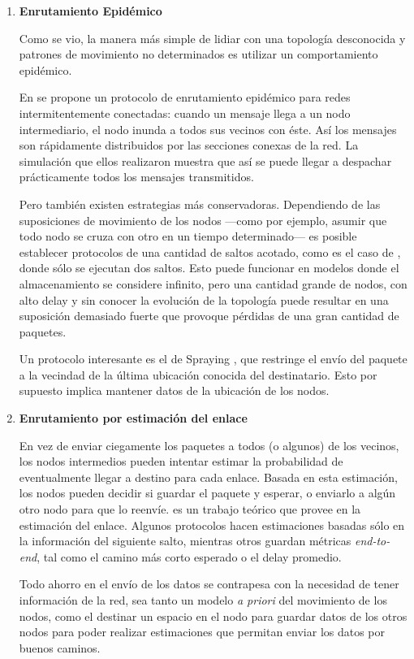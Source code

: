 \documentclass[10pt,preprint,onecolumn]{paper}
\begin{document}
\begin{enumerate}
\item \textbf{Enrutamiento Epidémico}

Como se vio, la manera más simple de lidiar con una topología desconocida y patrones de movimiento no determinados es utilizar un comportamiento epidémico.

En \cite{epidemic} se propone un protocolo de enrutamiento epidémico para redes intermitentemente conectadas: cuando un mensaje llega a un nodo intermediario, el nodo inunda a todos sus vecinos con éste. Así los mensajes son rápidamente distribuidos por las secciones conexas de la red. La simulación que ellos realizaron muestra que así se puede llegar a despachar prácticamente todos los mensajes transmitidos.

Pero también existen estrategias más conservadoras. Dependiendo de las suposiciones de movimiento de los nodos ---como por ejemplo, asumir que todo nodo se cruza con otro en un tiempo determinado--- es posible establecer protocolos de una cantidad de saltos acotado, como es el caso de \cite{teo2}, donde sólo se ejecutan dos saltos. Esto puede funcionar en modelos donde el almacenamiento se considere infinito, pero una cantidad grande de nodos, con alto delay y sin conocer la evolución de la topología puede resultar en una suposición demasiado fuerte que provoque pérdidas de una gran cantidad de paquetes.

Un protocolo interesante es el de Spraying \cite{24}, que restringe el envío del paquete a la vecindad de la última ubicación conocida del destinatario. Esto por supuesto implica mantener datos de la ubicación de los nodos.

\item \textbf{Enrutamiento por estimación del enlace}

En vez de enviar ciegamente los paquetes a todos (o algunos) de los vecinos, los nodos intermedios pueden intentar estimar la probabilidad de eventualmente llegar a destino para cada enlace. Basada en esta estimación, los nodos pueden decidir si guardar el paquete y esperar, o enviarlo a algún otro nodo para que lo reenvíe. \cite{49} es un trabajo teórico que provee en la estimación del enlace. Algunos protocolos hacen estimaciones basadas sólo en la información  del siguiente salto\cite{26}, mientras otros guardan métricas \emph{end-to-end}, tal como el camino más corto esperado o el delay promedio.

Todo ahorro en el envío de los datos se contrapesa con la necesidad de tener información de la red, sea tanto un modelo \emph{a priori} del movimiento de los nodos, como el destinar un espacio en el nodo para guardar datos de los otros nodos para poder realizar estimaciones que permitan enviar los datos por buenos caminos. 
\end{enumerate}
\end{document}
